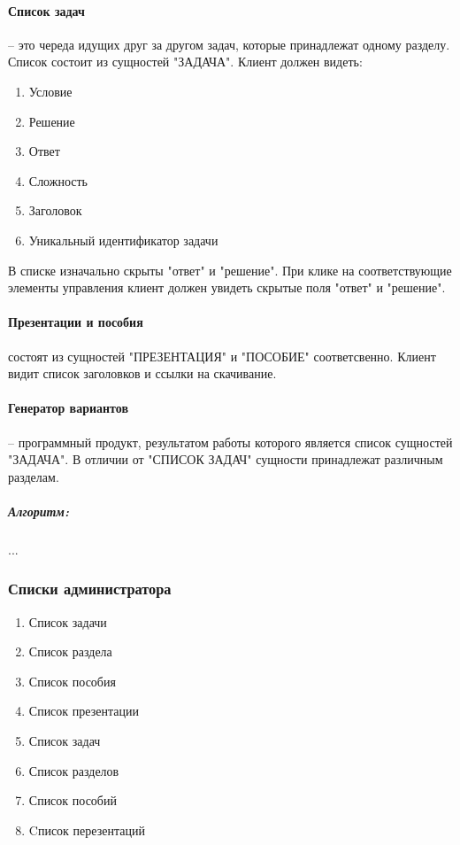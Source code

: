 \paragraph{Список задач} -- это череда идущих друг за другом задач, которые принадлежат одному разделу. Список состоит из сущностей "ЗАДАЧА". Клиент должен видеть:
\begin{enumerate}
  \item Условие
  \item Решение
  \item Ответ
  \item Сложность
  \item Заголовок
  \item Уникальный идентификатор задачи
\end{enumerate}
В списке изначально скрыты "ответ" и "решение". При клике на соответствующие элементы управления клиент должен увидеть скрытые поля "ответ" и "решение".

\paragraph{Презентации и пособия} состоят из сущностей "ПРЕЗЕНТАЦИЯ" и "ПОСОБИЕ" соответсвенно. Клиент видит список заголовков и ссылки на скачивание.

\paragraph{Генератор вариантов} -- программный продукт, результатом работы которого является список сущностей "ЗАДАЧА". В отличии от "СПИСОК ЗАДАЧ" сущности принадлежат различным разделам.
\subparagraph{Алгоритм:} ...

\subsubsection{Списки администратора}
\begin{enumerate}
  \item Список задачи
  \item Список раздела
  \item Список пособия
  \item Список презентации
  \item Список задач
  \item Список разделов
  \item Список пособий
  \item Cписок перезентаций
\end{enumerate}

